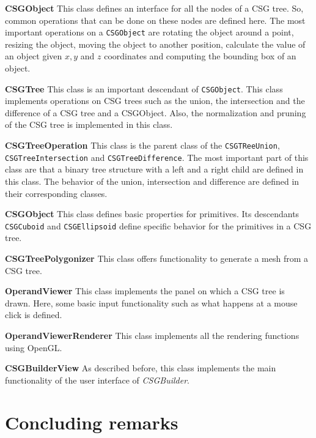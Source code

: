 \documentclass[a4wide,10pt,twocolumn]{article}
\begin{document}
\begin{list}{}{\leftmargin=0em}
    \item[] \textbf{CSGObject} This class defines an interface for all the nodes of a CSG tree. So, common operations that can be done on these nodes are defined here. The most important operations on a \texttt{CSGObject} are rotating the object around a point, resizing the object, moving the object to another position, calculate the value of an object given $x, y$ and $z$ coordinates and computing the bounding box of an object.
    \item[] \textbf{CSGTree} This class is an important descendant of \texttt{CSGObject}. This class implements operations on CSG trees such as the union, the intersection and the difference of a CSG tree and a CSGObject. Also, the normalization and pruning of the CSG tree is implemented in this class.
    \item[] \textbf{CSGTreeOperation} This class is the parent class of the \texttt{CSGTReeUnion}, \texttt{CSGTreeIntersection} and \texttt{CSGTreeDifference}. The most important part of this class are that a binary tree structure with a left and a right child are defined in this class. The behavior of the union, intersection and difference are defined in their corresponding classes.
    \item[] \textbf{CSGObject} This class defines basic properties for primitives. Its descendants \texttt{CSGCuboid} and \texttt{CSGEllipsoid} define specific behavior for the primitives in a CSG tree.
    \item[] \textbf{CSGTreePolygonizer} This class offers functionality to generate a mesh from a CSG tree.
    \item[] \textbf{OperandViewer} This class implements the panel on which a CSG tree is drawn. Here, some basic input functionality such as what happens at a mouse click is defined.
    \item[] \textbf{OperandViewerRenderer} This class implements all the rendering functions using OpenGL.
    \item[] \textbf{CSGBuilderView} As described before, this class implements the main functionality of the user interface of \emph{CSGBuilder}.
\end{list}

\section{Concluding remarks}
\label{sect:evaluation}
\end{document}
